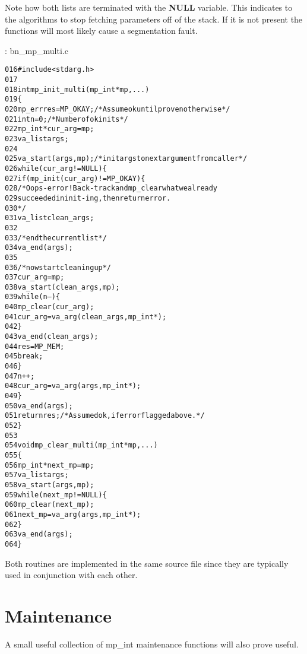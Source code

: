 \documentclass[b5paper]{book}
\begin{document}
Note how both lists are terminated with the \textbf{NULL} variable.  This indicates to the algorithms to stop fetching parameters off
of the stack.  If it is not present the functions will most likely cause a segmentation fault.  

\vspace{+3mm}\begin{small}
\hspace{-5.1mm}{\bf File}: bn\_mp\_multi.c
\vspace{-3mm}
\begin{alltt}
016   #include <stdarg.h>
017   
018   int mp_init_multi(mp_int *mp, ...) 
019   \{
020       mp_err res = MP_OKAY;      /* Assume ok until proven otherwise */
021       int n = 0;                 /* Number of ok inits */
022       mp_int* cur_arg = mp;
023       va_list args;
024   
025       va_start(args, mp);        /* init args to next argument from caller */
026       while (cur_arg != NULL) \{
027           if (mp_init(cur_arg) != MP_OKAY) \{
028               /* Oops - error! Back-track and mp_clear what we already
029                  succeeded in init-ing, then return error.
030               */
031               va_list clean_args;
032               
033               /* end the current list */
034               va_end(args);
035               
036               /* now start cleaning up */            
037               cur_arg = mp;
038               va_start(clean_args, mp);
039               while (n--) \{
040                   mp_clear(cur_arg);
041                   cur_arg = va_arg(clean_args, mp_int*);
042               \}
043               va_end(clean_args);
044               res = MP_MEM;
045               break;
046           \}
047           n++;
048           cur_arg = va_arg(args, mp_int*);
049       \}
050       va_end(args);
051       return res;                /* Assumed ok, if error flagged above. */
052   \}
053   
054   void mp_clear_multi(mp_int *mp, ...) 
055   \{
056       mp_int* next_mp = mp;
057       va_list args;
058       va_start(args, mp);
059       while (next_mp != NULL) \{
060           mp_clear(next_mp);
061           next_mp = va_arg(args, mp_int*);
062       \}
063       va_end(args);
064   \}
\end{alltt}
\end{small}

Both routines are implemented in the same source file since they are typically used in conjunction with each other.  

\section{Maintenance}
A small useful collection of mp\_int maintenance functions will also prove useful.  
\end{document}
